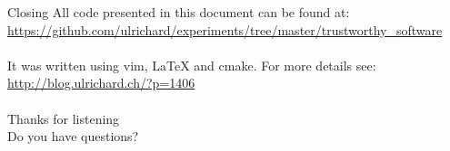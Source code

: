 \documentclass[11pt]{beamer}
\begin{document}
\begin{frame}{Closing}
All code presented in this document can be found at:\\
\href{https://github.com/ulrichard/experiments/tree/master/trustworthy\textunderscoresoftware}{https://github.com/ulrichard/experiments/tree/master/trustworthy\_software}\\
\\[0.5cm]
It was written using vim, LaTeX and cmake. For more details see:\\
\href{http://blog.ulrichard.ch/?p=1406}{http://blog.ulrichard.ch/?p=1406}\\
\\[0.5cm]
Thanks for listening
\\[0.5cm]
Do you have questions?
\end{frame}
\end{document}
